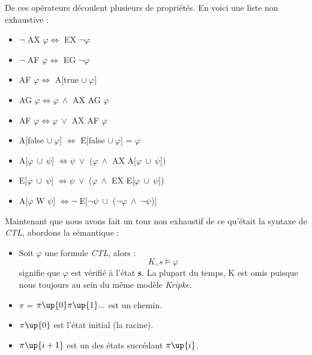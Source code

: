 \documentclass[runningheads,a4paper]{llncs}
\begin{document}
\noindent De ces opérateurs découlent plusieurs de propriétés. En voici une liste non exhaustive : 
\begin{itemize}
\item $\lnot$ AX $\varphi \Leftrightarrow $ EX $\lnot \varphi$
\item $\lnot$ AF $\varphi \Leftrightarrow $ EG $\lnot \varphi$
\item AF $\varphi \Leftrightarrow $ A[true $\cup \ \varphi$]
\item AG $\varphi \Leftrightarrow \varphi \ \land$ AX AG $\varphi$
\item AF $\varphi \Leftrightarrow \varphi \ \lor$ AX AF $\varphi$
\item A[false $\cup \ \varphi$] $ \Leftrightarrow $ E[false $\cup \ \varphi$] = $\varphi$
\item A[$\varphi \ \cup \ \psi$] $ \Leftrightarrow \psi \ \lor$ ($\varphi \ \land$ AX A[$\varphi \ \cup \ \psi$])
\item E[$\varphi \ \cup \ \psi$] $ \Leftrightarrow \psi \ \lor$ ($\varphi \ \land$ EX E[$\varphi \ \cup \ \psi$])
\item A[$\varphi$ W $\psi$] $ \Leftrightarrow \lnot$ E[$\lnot \psi \ \cup$ ($\lnot \varphi \ \land \ \lnot \psi$)]\\
\end{itemize}

\noindent Maintenant que nous avons fait un tour non exhaustif de ce qu'était la syntaxe de \textit{CTL}, abordons la sémantique :  \\

\begin{itemize}
\item Soit $\varphi$ une formule \textit{CTL}, alors : $$K, s \vDash \varphi$$ signifie que $\varphi$ est vérifié à l'état \textbf{s}. La plupart du temps, K est omis puisque nous toujours au sein du même modèle \textit{Kripke}.\\
\item $\pi$ = $\pi\up{0} \pi\up{1} ...$ est un chemin.
\item $\pi\up{0}$ est l'état initial (la racine).
\item $\pi\up{i+1}$ est un des états succédant $\pi\up{i}$.\\
\end{itemize}
\end{document}
